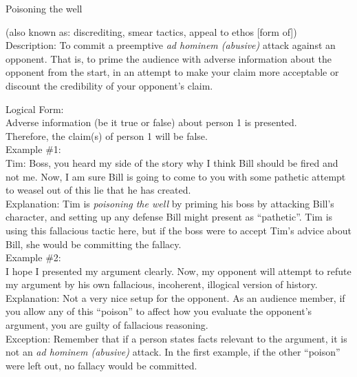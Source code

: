 \documentclass[a4paper,12pt,single,pdftex]{scrartcl}
\begin{document}
  

Poisoning the well
    
      (also known as: discrediting, smear tactics, appeal to ethos [form of])
    \\

  
    Description: To commit a preemptive {\it ad hominem (abusive)}  attack against an opponent.  That is, to prime the audience with adverse information about the opponent from the start, in an attempt to make your claim more acceptable or discount the credibility of your opponent’s claim.

    
      Logical Form:
    \\

    
      Adverse information (be it true or false) about person 1 is presented.
    \\

    
      Therefore, the claim(s) of person 1 will be false.
    \\

    
      Example \#1:
    \\

    
      Tim: Boss, you heard my side of the story why I think Bill should be fired and not me.  Now, I am sure Bill is going to come to you with some pathetic attempt to weasel out of this lie that he has created.
    \\

    
      Explanation: Tim is {\it poisoning the well} by priming his boss by attacking Bill’s character, and setting up any defense Bill might present as “pathetic”.  Tim is using this fallacious tactic here, but if the boss were to accept Tim’s advice about Bill, she would be committing the fallacy.
    \\

    
      Example \#2:
    \\

    
      I hope I presented my argument clearly.  Now, my opponent will attempt to refute my argument by his own fallacious, incoherent, illogical version of history.
    \\

    
      Explanation: Not a very nice setup for the opponent.  As an audience member, if you allow any of this “poison” to affect how you evaluate the opponent’s argument, you are guilty of fallacious reasoning.
    \\

    
      Exception: Remember that if a person states facts relevant to the argument, it is not an {\it ad hominem (abusive)} attack.  In the first example, if the other “poison” were left out, no fallacy would be committed.
    \\
\end{document}
